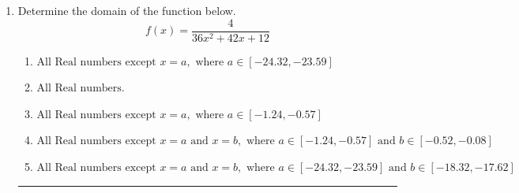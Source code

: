 \documentclass[14pt]{extbook}
\newcommand{\litem}[1]{\item#1\hspace*{-1cm}\rule{\textwidth}{0.4pt}}
\begin{document}
\begin{enumerate}
{\begin{enumerate}[label=\Alph*.]
\end{enumerate} }
\litem{
Determine the domain of the function below.\[ f(x) = \frac{4}{36x^{2} +42 x + 12} \]\begin{enumerate}[label=\Alph*.]
\item \( \text{All Real numbers except } x = a, \text{ where } a \in [-24.32, -23.59] \)
\item \( \text{All Real numbers.} \)
\item \( \text{All Real numbers except } x = a, \text{ where } a \in [-1.24, -0.57] \)
\item \( \text{All Real numbers except } x = a \text{ and } x = b, \text{ where } a \in [-1.24, -0.57] \text{ and } b \in [-0.52, -0.08] \)
\item \( \text{All Real numbers except } x = a \text{ and } x = b, \text{ where } a \in [-24.32, -23.59] \text{ and } b \in [-18.32, -17.62] \)


\end{enumerate}}
\end{enumerate}
\end{document}
